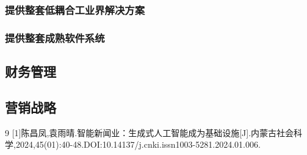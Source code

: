 \documentclass[withoutpreface,bwprint]{cumcmthesis} %
\begin{document}
	\subsubsection{ 提供整套低耦合工业界解决方案}
	\subsubsection{ 提供整套成熟软件系统}
	\subsection{财务管理}
	\subsection{营销战略}
	\newpage
	
	\begin{thebibliography}{9}%
		[1]陈昌凤,袁雨晴.智能新闻业：生成式人工智能成为基础设施[J].内蒙古社会科学,2024,45(01):40-48.DOI:10.14137/j.cnki.issn1003-5281.2024.01.006.
	\end{thebibliography}
	
	\newpage
\end{document}
